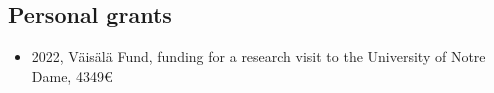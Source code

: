 \documentclass{article}
\begin{document}
          

        \subsection{Personal grants}
        \begin{itemize}
          \item 2022, Väisälä Fund, funding for a research visit to the University of Notre Dame, 4349€
        \end{itemize}        
\end{document}
